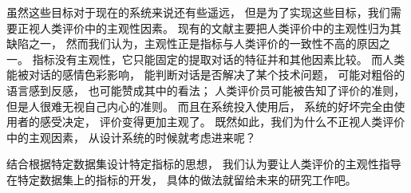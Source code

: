 虽然这些目标对于现在的系统来说还有些遥远，
但是为了实现这些目标，我们需要正视人类评价中的主观性因素。
现有的文献主要把人类评价中的主观性归为其缺陷之一，
然而我们认为，主观性正是指标与人类评价的一致性不高的原因之一。
指标没有主观性，它只能固定的提取对话的特征并和其他因素比较。
而人类能被对话的感情色彩影响，
能判断对话是否解决了某个技术问题，
可能对粗俗的语言感到反感，
也可能赞成其中的看法；
人类评价员可能被告知了评价的准则，
但是人很难无视自己内心的准则。
而且在系统投入使用后，
系统的好坏完全由使用者的感受决定，
评价变得更加主观了。
既然如此，我们为什么不正视人类评价中的主观因素，
从设计系统的时候就考虑进来呢？

结合根据特定数据集设计特定指标的思想，
我们认为要让人类评价的主观性指导在特定数据集上的指标的开发，
具体的做法就留给未来的研究工作吧。
